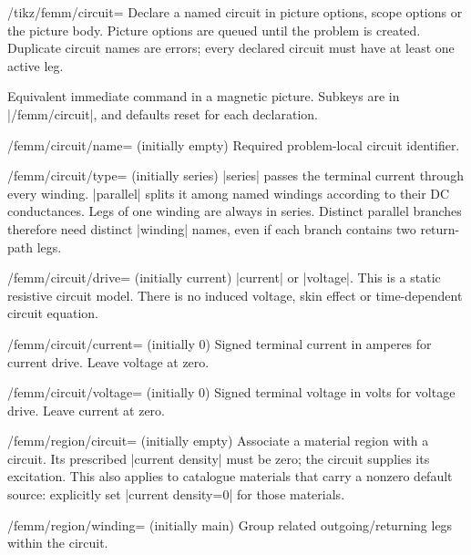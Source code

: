 \begin{key}{/tikz/femm/circuit=}
Declare a named circuit in picture options, scope options or the picture body.
Picture options are queued until the problem is created. Duplicate circuit
names are errors; every declared circuit must have at least one active leg.
\end{key}
\begin{command}{\femmcircuit{}}
Equivalent immediate command in a magnetic picture. Subkeys are in
|/femm/circuit|, and defaults reset for each declaration.
\end{command}
\begin{key}{/femm/circuit/name= (initially empty)}
Required problem-local circuit identifier.
\end{key}
\begin{key}{/femm/circuit/type= (initially series)}
|series| passes the terminal current through every winding. |parallel| splits
it among named windings according to their DC conductances. Legs of one winding
are always in series. Distinct parallel branches therefore need distinct
|winding| names, even if each branch contains two return-path legs.
\end{key}
\begin{key}{/femm/circuit/drive= (initially current)}
|current| or |voltage|. This is a static resistive circuit model. There is no
induced voltage, skin effect or time-dependent circuit equation.
\end{key}
\begin{key}{/femm/circuit/current= (initially 0)}
Signed terminal current in amperes for current drive. Leave voltage at zero.
\end{key}
\begin{key}{/femm/circuit/voltage= (initially 0)}
Signed terminal voltage in volts for voltage drive. Leave current at zero.
\end{key}
\begin{key}{/femm/region/circuit= (initially empty)}
Associate a material region with a circuit. Its prescribed |current density|
must be zero; the circuit supplies its excitation. This also applies to
catalogue materials that carry a nonzero default source: explicitly set
|current density=0| for those materials.
\end{key}
\begin{key}{/femm/region/winding= (initially main)}
Group related outgoing/returning legs within the circuit.
\end{key}
